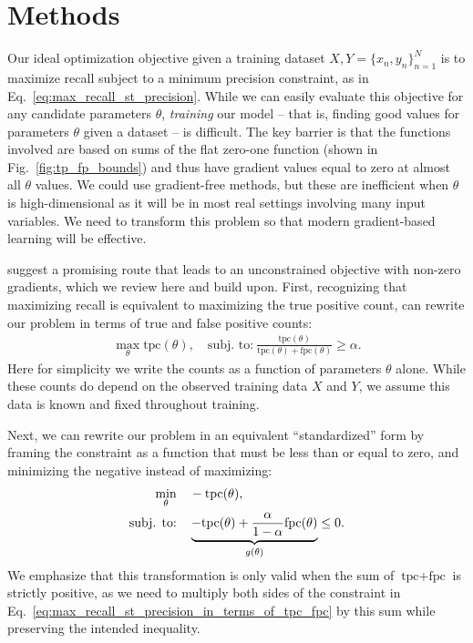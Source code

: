 \section{Methods}
Our ideal optimization objective given a training dataset $X, Y = \{x_n, y_n\}_{n=1}^N$ is to maximize recall subject to a minimum precision constraint, as in Eq.~\eqref{eq:max_recall_st_precision}.
While we can easily evaluate this objective for any candidate parameters $\theta$, \emph{training} our model -- that is, finding good values for parameters $\theta$ given a dataset -- is difficult. The key barrier is that the functions involved are based on sums of the flat zero-one function (shown in Fig.~\ref{fig:tp_fp_bounds}) and thus have gradient values equal to zero at almost all $\theta$ values.
We could use gradient-free methods, but these are inefficient when $\theta$ is high-dimensional as it will be in most real settings involving many input variables.
We need to transform this problem so that modern gradient-based learning will be effective.

\citet{ebanScalableLearningNonDecomposable2017} suggest a promising route that leads to an unconstrained objective with non-zero gradients, which we review here and build upon.
First, recognizing that maximizing recall is equivalent to maximizing the true positive count, can rewrite our problem in terms of true and false positive counts:
\begin{align}
\max_{\theta} \text{tpc}(\theta)
\label{eq:max_recall_st_precision_in_terms_of_tpc_fpc},
\quad \text{subj. to:}~ 
\frac{\text{tpc}(\theta)}
	 {\text{tpc}(\theta) + \text{fpc}(\theta)} \geq \alpha.
\end{align}
Here for simplicity we write the counts as a function of parameters $\theta$ alone. While these counts do depend on the observed training data $X$ and $Y$, we assume this data is known and fixed throughout training.

Next, we can rewrite our problem in an equivalent ``standardized'' form by framing the constraint as a function that must be less than or equal to zero, and minimizing the negative instead of maximizing:
\begin{align}
\min_{\theta} \quad & - \text{tpc}(\theta),
\label{eq:standardized_objective_constrained}
\\ \notag
\text{subj. to:} \quad & 
\underbrace{- \text{tpc}(\theta) + \frac{\alpha}{1-\alpha} \text{fpc}(\theta)}_{g(\theta)} \leq 0.
\end{align}
We emphasize that this transformation is only valid when the sum of $\text{tpc} + \text{fpc}$ is strictly positive, as we need to multiply both sides of the constraint in Eq.~\eqref{eq:max_recall_st_precision_in_terms_of_tpc_fpc} by this sum while preserving the intended inequality.

